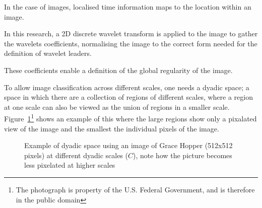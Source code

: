 \documentclass[conference]{IEEEtran}
\begin{document}
In the case of images, localised time information maps to the location within
an image.

In this research, a 2D discrete wavelet transform is applied to the image to
gather the wavelets coefficients, normalising the image to the correct form
needed for the definition of wavelet leaders.

These coefficients enable a definition of the global regularity of the image.

To allow image classification across different scales, one needs a dyadic
space; a space in which there are a collection of regions of different scales,
where a region at one scale can also be viewed as the union of regions in a
smaller scale. Figure~\ref{fig:dyadic-image}\footnote{The photograph is
property of the U.S. Federal Government, and is therefore in the public
domain} shows an example of this where the large regions show only a pixalated
view of the image and the smallest the individual pixels of the image.

\begin{figure}[ht]
\centering
{}%
\hspace{.2in}%
%
\hspace{.2in}%
%
\hspace{.2in}%
%
\caption{Example of dyadic space using an image of Grace Hopper (512x512
pixels) at different dyadic scales ($C$), note how the picture becomes less
pixelated at higher scales}
\label{fig:dyadic-image}
\end{figure}
\end{document}
